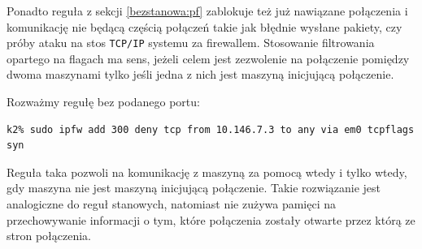 Ponadto reguła z sekcji \ref{bezstanowa:pf} zablokuje też już nawiązane
połączenia i komunikację nie będącą częścią połączeń takie jak błędnie wysłane
pakiety, czy próby ataku na stos \texttt{TCP/IP} systemu za firewallem.
Stosowanie filtrowania opartego na flagach \tcp{} ma sens, jeżeli celem jest
zezwolenie na połączenie pomiędzy dwoma maszynami tylko jeśli jedna z nich jest
maszyną inicjującą połączenie.

Rozważmy regułę bez podanego portu:

\begin{lstlisting}
k2% sudo ipfw add 300 deny tcp from 10.146.7.3 to any via em0 tcpflags syn
\end{lstlisting}

Reguła taka pozwoli na komunikację z maszyną \volt{} za pomocą \tcp{} wtedy i
tylko wtedy, gdy maszyna \volt{} nie jest maszyną inicjującą połączenie. Takie
rozwiązanie jest analogiczne do reguł stanowych, natomiast nie zużywa pamięci na
przechowywanie informacji o tym, które połączenia zostały otwarte przez którą ze
stron połączenia.

